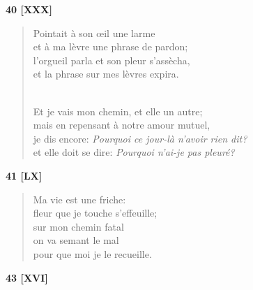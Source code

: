 \documentclass[a4paper,12pt]{book}
\begin{document}
\bigskip

\begin{center} {\bf 40 [XXX]} \end{center}

\begin{verse}
Pointait à son {\oe}il une larme \\
et à ma lèvre une phrase de pardon; \\
l'orgueil parla et son pleur s'assècha, \\
et la phrase sur mes lèvres expira. \\ \


Et je vais mon chemin, et elle un autre; \\
mais en repensant à notre amour mutuel, \\
je dis encore: {\em Pourquoi ce jour-là n'avoir rien dit?} \\
et elle doit se dire: {\em Pourquoi n'ai-je pas pleuré?} \\
\end{verse}

\bigskip

\begin{center} {\bf 41 [LX]} \end{center}

\begin{verse}
Ma vie est une friche: \\
fleur que je touche s'effeuille; \\
sur mon chemin fatal \\
on va semant le mal \\
pour que moi je le recueille. \\
\end{verse}

\bigskip

\begin{center} {\bf 43 [XVI]} \end{center}
\end{document}
